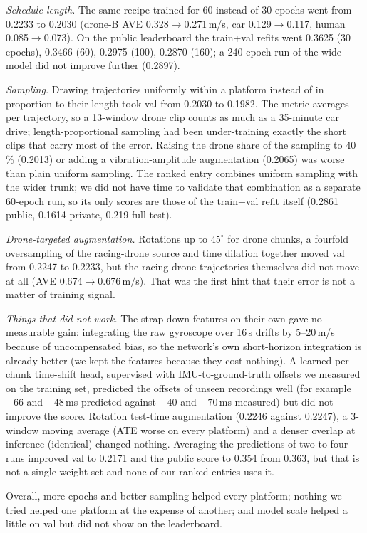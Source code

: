 \documentclass[letterpaper,10pt,conference]{ieeeconf}
\begin{document}
\emph{Schedule length.} The same recipe trained for 60 instead of 30 epochs went from 0.2233 to 0.2030 (drone-B AVE
0.328$\to$0.271\,m/s, car 0.129$\to$0.117, human 0.085$\to$0.073). On the public leaderboard the train+val refits
went 0.3625 (30 epochs), 0.3466 (60), 0.2975 (100), 0.2870 (160); a 240-epoch run of the wide model did not improve
further (0.2897).

\emph{Sampling.} Drawing trajectories uniformly within a platform instead of in proportion to their length took val
from 0.2030 to 0.1982. The metric averages per trajectory, so a 13-window drone clip counts as much as a 35-minute
car drive; length-proportional sampling had been under-training exactly the short clips that carry most of the error.
Raising the drone share of the sampling to 40\,\% (0.2013) or adding a vibration-amplitude augmentation (0.2065) was
worse than plain uniform sampling. The ranked entry combines uniform sampling with the wider trunk; we did not have time to validate
that combination as a separate 60-epoch run, so its only scores are those of the train+val refit itself (0.2861 public,
0.1614 private, 0.219 full test).

\emph{Drone-targeted augmentation.} Rotations up to $45^\circ$ for drone chunks, a fourfold oversampling of the
racing-drone source and time dilation together moved val from 0.2247 to 0.2233, but the racing-drone trajectories
themselves did not move at all (AVE 0.674$\to$0.676\,m/s). That was the first hint that their error is not a matter
of training signal.

\emph{Things that did not work.} The strap-down features on their own gave no measurable gain: integrating the raw
gyroscope over 16\,s drifts by 5--20\,m/s because of uncompensated bias, so the network's own short-horizon
integration is already better (we kept the features because they cost nothing). A learned per-chunk time-shift
head, supervised with IMU-to-ground-truth offsets we measured on the training set, predicted the offsets of unseen
recordings well (for example $-66$ and $-48$\,ms predicted against $-40$ and $-70$\,ms measured) but did not improve
the score. Rotation test-time augmentation (0.2246 against 0.2247), a 3-window moving average (ATE worse on every
platform) and a denser overlap at inference (identical) changed nothing. Averaging the predictions of two to four
runs improved val to 0.2171 and the public score to 0.354 from 0.363, but that is not a single weight set and none of
our ranked entries uses it.

Overall, more epochs and better sampling helped every platform; nothing we tried helped one platform at the expense
of another; and model scale helped a little on val but did not show on the leaderboard.
\end{document}
